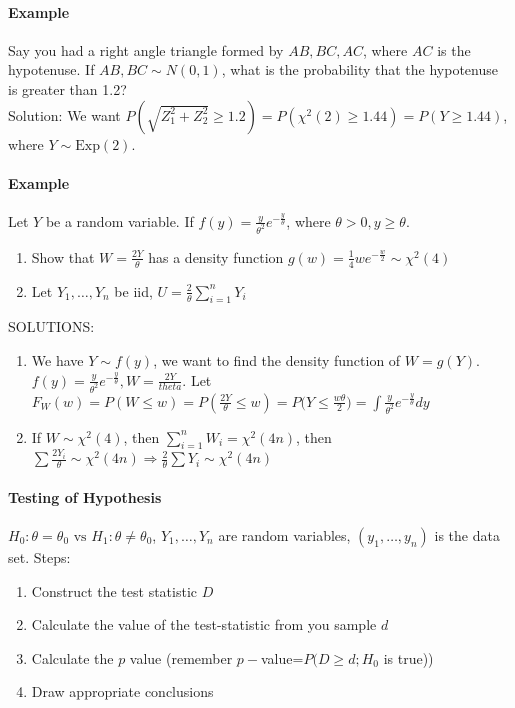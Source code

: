 \documentclass[10pt,letter]{article}
\theoremstyle{plain}
\theoremstyle{definition}
\begin{document}
\paragraph{Example}
Say you had a right angle triangle formed by $AB,BC,AC$, where $AC$ is the hypotenuse. If $AB,BC\sim N(0,1)$, what is the probability that the hypotenuse is greater than 1.2? \\ 
Solution: We want $P(\sqrt{Z_{1}^{2}+Z_{2}^{2}}\geq1.2)=P(\chi^{2}(2)\geq1.44)=P(Y\geq1.44)$, where $Y\sim\text{Exp}(2)$. 
\paragraph{Example}
Let $Y$ be a random variable. If $f(y)=\frac{y}{\theta^2}e^{-\frac{y}{\theta}}$, where $\theta>0,y\geq\theta$. \begin{enumerate}
    \item Show that $W=\frac{2Y}{\theta}$ has a density function $g(w)=\frac{1}{4}we^{-\frac{w}{2}}\sim\chi^2(4)$
    \item Let $Y_1,\ldots,Y_n$ be iid, $U=\frac{2}{\theta}\sum_{i=1}^nY_i$
\end{enumerate}
SOLUTIONS:
\begin{enumerate}
    \item We have $Y\sim f(y)$, we want to find the density function of $W=g(Y)$. $f(y)=\frac{y}{\theta^2}e^{-\frac{y}{\theta}},W=\frac{2Y}{theta}$. Let $F_W(w)=P(W\leq w)=P\left(\frac{2Y}{\theta}\leq w\right)=P\bigg(Y\leq\frac{w\theta}{2}\bigg)=\int\frac{y}{\theta^2}e^{-\frac{y}{\theta}}dy$
    \item If $W\sim\chi^2(4)$, then $\sum_{i=1}^nW_i=\chi^2(4n)$, then $\sum\frac{2Y_i}{\theta}\sim\chi^2(4n)\Rightarrow \frac{2}{\theta}\sum Y_i\sim\chi^2(4n)$
\end{enumerate}
\paragraph{Testing of Hypothesis}
$H_0:\theta=\theta_0 \text{ vs }H_1:\theta\neq\theta_0$, $Y_1,\ldots,Y_n$ are random variables, $(y_1,\ldots,y_n)$ is the data set. 
Steps:
\begin{enumerate}
    \item Construct the test statistic $D$
    \item Calculate the value of the test-statistic from you sample $d$ 
    \item Calculate the $p$ value (remember $p-$value=$P(D\geq d;H_0$ is true)) 
    \item Draw appropriate conclusions
\end{enumerate}
\end{document}
